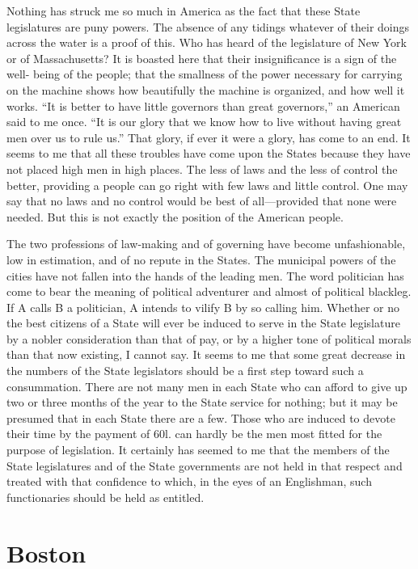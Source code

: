 Nothing has struck me so much in America as the fact that these
State legislatures are puny powers.  The absence of any tidings
whatever of their doings across the water is a proof of this.  Who
has heard of the legislature of New York or of Massachusetts?  It
is boasted here that their insignificance is a sign of the well-
being of the people; that the smallness of the power necessary for
carrying on the machine shows how beautifully the machine is
organized, and how well it works.  ``It is better to have little
governors than great governors,'' an American said to me once.  ``It
is our glory that we know how to live without having great men over
us to rule us.''  That glory, if ever it were a glory, has come to
an end.  It seems to me that all these troubles have come upon the
States because they have not placed high men in high places.  The
less of laws and the less of control the better, providing a people
can go right with few laws and little control.  One may say that no
laws and no control would be best of all---provided that none were
needed.  But this is not exactly the position of the American
people.

The two professions of law-making and of governing have become
unfashionable, low in estimation, and of no repute in the States.
The municipal powers of the cities have not fallen into the hands
of the leading men.  The word politician has come to bear the
meaning of political adventurer and almost of political blackleg.
If A calls B a politician, A intends to vilify B by so calling him.
Whether or no the best citizens of a State will ever be induced to
serve in the State legislature by a nobler consideration than that
of pay, or by a higher tone of political morals than that now
existing, I cannot say.  It seems to me that some great decrease in
the numbers of the State legislators should be a first step toward
such a consummation.  There are not many men in each State who can
afford to give up two or three months of the year to the State
service for nothing; but it may be presumed that in each State
there are a few.  Those who are induced to devote their time by the
payment of 60l. can hardly be the men most fitted for the purpose
of legislation.  It certainly has seemed to me that the members of
the State legislatures and of the State governments are not held in
that respect and treated with that confidence to which, in the eyes
of an Englishman, such functionaries should be held as entitled.



\chapter{Boston}


